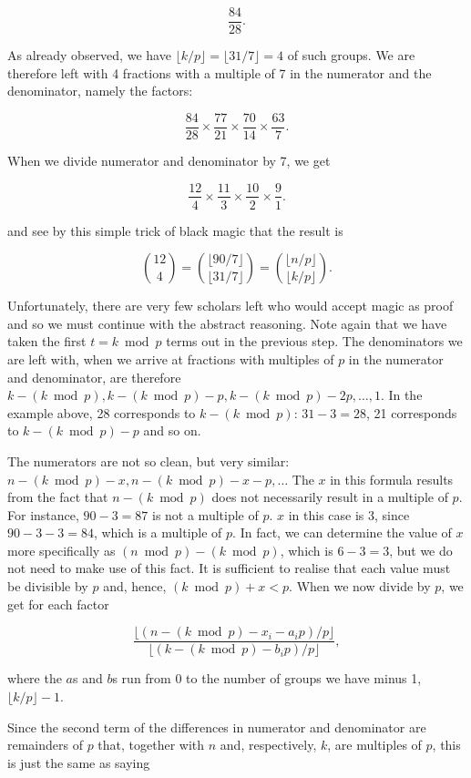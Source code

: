 \documentclass[tikz]{scrreprt}
\begin{document}
\[
\frac{84}{28}.
\]

As already observed, we have 
$\lfloor k/p\rfloor = \lfloor 31/7\rfloor = 4$ of such groups.
We are therefore left with 4 fractions with a multiple of 7 
in the numerator and the denominator, namely the factors:

\[
\frac{84}{28} \times \frac{77}{21} \times \frac{70}{14} \times \frac{63}{7}.
\]

When we divide numerator and denominator by 7,
we get

\[
\frac{12}{4} \times \frac{11}{3} \times \frac{10}{2} \times \frac{9}{1}.
\]

and see by this simple trick of black magic that the result is 

\[
\binom{12}{4} =
\binom{\lfloor 90/7\rfloor}{\lfloor 31/7\rfloor} =
\binom{\lfloor n/p\rfloor}{\lfloor k/p\rfloor}.
\]

Unfortunately, there are very few scholars left
who would accept magic as proof and so
we must continue with the abstract reasoning.
Note again that we have taken the first $t=k \bmod p$ terms
out in the previous step. The denominators 
we are left with, when we arrive at fractions with
multiples of $p$ in the numerator and denominator, are therefore
$k - (k \bmod p), k - (k \bmod p) - p, k - (k \bmod p) - 2p, \dots, 1$.
In the example above, 28 corresponds to $k - (k \bmod p)$:
$31 - 3 = 28$, 21 corresponds to $k - (k \bmod p) - p$ and so on.

The numerators are not so clean, but very similar:
$n - (k \bmod p) - x, n - (k \bmod p) - x - p, \dots$
The $x$ in this formula results from the fact
that $n - (k \bmod p)$ does not necessarily result
in a multiple of $p$. For instance, $90 - 3 = 87$ is not
a multiple of $p$. $x$ in this case is 3, since
$90 - 3 - 3 = 84$, which is a multiple of $p$.
In fact, we can determine the value of $x$ more specifically
as $(n \bmod p) - (k \bmod p)$, which is $6 - 3 = 3$,
but we do not need to make use of this fact.
It is sufficient to realise that each value
must be divisible by $p$ and, hence, $(k \bmod p) + x < p$.
When we now divide by $p$, we get for each factor

\[
\frac{\lfloor (n - (k \bmod p) - x_i - a_ip) / p\rfloor}
     {\lfloor (k - (k \bmod p) - b_ip) / p\rfloor},
\]

where the $a$s and $b$s run from 0 to the number of groups we have minus 1,
\ie\ $\lfloor k/p \rfloor - 1$.

Since the second term of the differences in 
numerator and denominator are remainders of $p$ that,
together with $n$ and, respectively, $k$, are
multiples of $p$, this is just the same as saying
\end{document}
